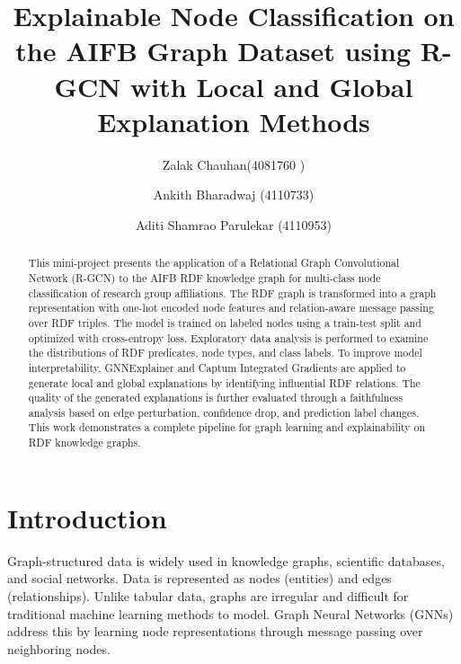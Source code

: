 \documentclass[runningheads]{llncs}
\begin{document}
%
\title{Explainable Node Classification on the AIFB Graph Dataset using R-GCN with Local and Global Explanation Methods}
%
%
\author{Zalak Chauhan(4081760 )
\and Ankith Bharadwaj (4110733)
\and Aditi Shamrao Parulekar (4110953)}


%
\maketitle              %
%
\begin{abstract}


This mini-project presents the application of a Relational Graph Convolutional Network (R-GCN) to the AIFB RDF knowledge graph for multi-class node classification of research group affiliations. The RDF graph is transformed into a graph representation with one-hot encoded node features and relation-aware message passing over RDF triples. The model is trained on labeled nodes using a train-test split and optimized with cross-entropy loss. Exploratory data analysis is performed to examine the distributions of RDF predicates, node types, and class labels. To improve model interpretability, GNNExplainer and Captum Integrated Gradients are applied to generate local and global explanations by identifying influential RDF relations. The quality of the generated explanations is further evaluated through a faithfulness analysis based on edge perturbation, confidence drop, and prediction label changes. This work demonstrates a complete pipeline for graph learning and explainability on RDF knowledge graphs.


\end{abstract}
%
%
%
\section{Introduction}

Graph-structured data is widely used in knowledge graphs, scientific databases, and social networks. Data is represented as nodes (entities) and edges (relationships). Unlike tabular data, graphs are irregular and difficult for traditional machine learning methods to model. Graph Neural Networks (GNNs) address this by learning node representations through message passing over neighboring nodes.
\end{document}
